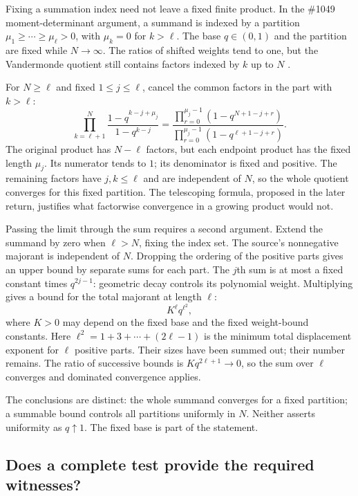 Fixing a summation index need not leave a fixed finite product. In the \#1049
moment-determinant argument, a summand is indexed by a partition
$\mu_1\ge\cdots\ge\mu_\ell>0$, with $\mu_k=0$ for $k>\ell$.
The base $q\in(0,1)$ and the partition are fixed while $N\to\infty$.
The ratios of shifted weights tend to one, but the Vandermonde quotient
still contains factors indexed by $k$ up to $N$
\cite[proof for geometric moment determinants]{paper1049}.

For $N\ge\ell$ and fixed $1\le j\le\ell$, cancel the common factors in
the part with $k>\ell$:
\[
 \prod_{k=\ell+1}^{N}
       \frac{1-q^{k-j+\mu_j}}{1-q^{k-j}}
 =\frac{\displaystyle\prod_{r=0}^{\mu_j-1}(1-q^{N+1-j+r})}
        {\displaystyle\prod_{r=0}^{\mu_j-1}(1-q^{\ell+1-j+r})}.
\]
The original product has $N-\ell$ factors, but each endpoint product has the
fixed length $\mu_j$. Its numerator tends to $1$; its denominator is fixed
and positive. The remaining factors have $j,k\le\ell$ and are independent
of $N$, so the whole quotient converges for this fixed partition. The
telescoping formula, proposed in the later return, justifies what factorwise
convergence in a growing product would not.

Passing the limit through the sum requires a second argument. Extend the
summand by zero when $\ell>N$, fixing the index set. The source's nonnegative
majorant is independent of $N$. Dropping the ordering of the positive parts
gives an upper bound by separate sums for each part. The $j$th sum is at most
a fixed constant times $q^{2j-1}$: geometric decay controls its polynomial
weight. Multiplying gives a bound for the total majorant at length $\ell$:
\[
                         K^\ell q^{\ell^2},
\]
where $K>0$ may depend on the fixed base and the fixed weight-bound constants.
Here $\ell^2=1+3+\cdots+(2\ell-1)$ is the minimum total displacement exponent
for $\ell$ positive parts. Their sizes have been summed out; their number
remains. The ratio of successive bounds is $Kq^{2\ell+1}\to0$, so the sum over
$\ell$ converges and dominated convergence applies.

The conclusions are distinct: the whole summand converges for a fixed partition;
a summable bound controls all partitions uniformly in $N$. Neither asserts
uniformity as $q\uparrow1$. The fixed base is part of the statement.

\subsection{Does a complete test provide the required witnesses?}\label{sec:detection}


